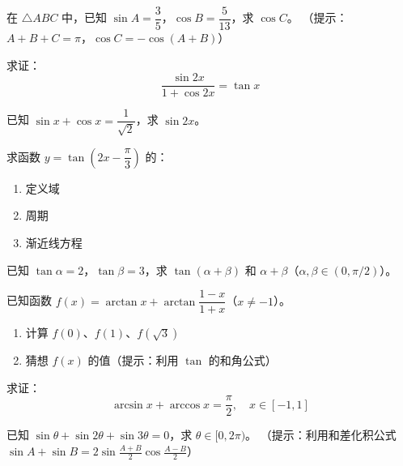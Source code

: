 \begin{exercise}[4]
在 \(\triangle ABC\) 中，已知 \(\sin A = \dfrac{3}{5}\)，\(\cos B = \dfrac{5}{13}\)，求 \(\cos C\)。
（提示：\(A + B + C = \pi\)，\(\cos C = -\cos(A+B)\)）
\end{exercise}


\begin{exercise}[5]
求证：
\[
\frac{\sin 2x}{1 + \cos 2x} = \tan x
\]
\end{exercise}

\begin{exercise}[5]
已知 \(\sin x + \cos x = \dfrac{1}{\sqrt{2}}\)，求 \(\sin 2x\)。
\end{exercise}

\begin{exercise}[5]
求函数 \(y = \tan\left(2x - \dfrac{\pi}{3}\right)\) 的：
\begin{enumerate}
  \item[(1)] 定义域
  \item[(2)] 周期
  \item[(3)] 渐近线方程
\end{enumerate}
\end{exercise}

\begin{exercise}[5]
已知 \(\tan \alpha = 2\)，\(\tan \beta = 3\)，求 \(\tan(\alpha + \beta)\) 和 \(\alpha + \beta\)（\(\alpha, \beta \in (0, \pi/2)\)）。
\end{exercise}


\begin{exercise}[6]
已知函数 \(f(x) = \arctan x + \arctan \dfrac{1 - x}{1 + x}\)（\(x \neq -1\)）。
\begin{enumerate}
  \item[(1)] 计算 \(f(0)\)、\(f(1)\)、\(f(\sqrt{3})\)
  \item[(2)] 猜想 \(f(x)\) 的值（提示：利用 \(\tan\) 的和角公式）
\end{enumerate}
\end{exercise}

\begin{exercise}[6]
求证：
\[
\arcsin x + \arccos x = \frac{\pi}{2}, \quad x \in [-1, 1]
\]
\end{exercise}

\begin{exercise}[6]
已知 \(\sin \theta + \sin 2\theta + \sin 3\theta = 0\)，求 \(\theta \in [0, 2\pi)\)。
（提示：利用和差化积公式 \(\sin A + \sin B = 2\sin\frac{A+B}{2}\cos\frac{A-B}{2}\)）
\end{exercise}


